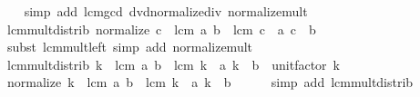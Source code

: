 \begin{isabellebody}
%
\isadelimproof
\ \ %
\endisadelimproof
%
\isatagproof
{}\isamarkupfalse%
\ {\isacharparenleft}{\kern0pt}simp\ add{\isacharcolon}{\kern0pt}\ lcm{\isacharunderscore}{\kern0pt}gcd\ dvd{\isacharunderscore}{\kern0pt}normalize{\isacharunderscore}{\kern0pt}div\ normalize{\isacharunderscore}{\kern0pt}mult{\isacharparenright}{\kern0pt}%
\endisatagproof
{\isafoldproof}%
%
\isadelimproof
\isanewline
%
\endisadelimproof
\isanewline
{}\isamarkupfalse%
\ lcm{\isacharunderscore}{\kern0pt}mult{\isacharunderscore}{\kern0pt}distrib{\isacharprime}{\kern0pt}{\isacharcolon}{\kern0pt}\ {\isachardoublequoteopen}normalize\ c\ {\isacharasterisk}{\kern0pt}\ lcm\ a\ b\ {\isacharequal}{\kern0pt}\ lcm\ {\isacharparenleft}{\kern0pt}c\ {\isacharasterisk}{\kern0pt}\ a{\isacharparenright}{\kern0pt}\ {\isacharparenleft}{\kern0pt}c\ {\isacharasterisk}{\kern0pt}\ b{\isacharparenright}{\kern0pt}{\isachardoublequoteclose}\isanewline
%
\isadelimproof
\ \ %
\endisadelimproof
%
\isatagproof
{}\isamarkupfalse%
\ {\isacharparenleft}{\kern0pt}subst\ lcm{\isacharunderscore}{\kern0pt}mult{\isacharunderscore}{\kern0pt}left{\isacharparenright}{\kern0pt}\ {\isacharparenleft}{\kern0pt}simp\ add{\isacharcolon}{\kern0pt}\ normalize{\isacharunderscore}{\kern0pt}mult{\isacharparenright}{\kern0pt}%
\endisatagproof
{\isafoldproof}%
%
\isadelimproof
\isanewline
%
\endisadelimproof
\isanewline
{}\isamarkupfalse%
\ lcm{\isacharunderscore}{\kern0pt}mult{\isacharunderscore}{\kern0pt}distrib{\isacharcolon}{\kern0pt}\ {\isachardoublequoteopen}k\ {\isacharasterisk}{\kern0pt}\ lcm\ a\ b\ {\isacharequal}{\kern0pt}\ lcm\ {\isacharparenleft}{\kern0pt}k\ {\isacharasterisk}{\kern0pt}\ a{\isacharparenright}{\kern0pt}\ {\isacharparenleft}{\kern0pt}k\ {\isacharasterisk}{\kern0pt}\ b{\isacharparenright}{\kern0pt}\ {\isacharasterisk}{\kern0pt}\ unit{\isacharunderscore}{\kern0pt}factor\ k{\isachardoublequoteclose}\isanewline
%
\isadelimproof
%
\endisadelimproof
%
\isatagproof
{}\isamarkupfalse%
{\isacharminus}{\kern0pt}\isanewline
\ \ \isamarkupfalse%
\ {\isachardoublequoteopen}normalize\ k\ {\isacharasterisk}{\kern0pt}\ lcm\ a\ b\ {\isacharequal}{\kern0pt}\ lcm\ {\isacharparenleft}{\kern0pt}k\ {\isacharasterisk}{\kern0pt}\ a{\isacharparenright}{\kern0pt}\ {\isacharparenleft}{\kern0pt}k\ {\isacharasterisk}{\kern0pt}\ b{\isacharparenright}{\kern0pt}{\isachardoublequoteclose}\isanewline
\ \ \ \ \isamarkupfalse%
\ {\isacharparenleft}{\kern0pt}simp\ add{\isacharcolon}{\kern0pt}\ lcm{\isacharunderscore}{\kern0pt}mult{\isacharunderscore}{\kern0pt}distrib{\isacharprime}{\kern0pt}{\isacharparenright}{\kern0pt}\isanewline

\end{isabellebody}
